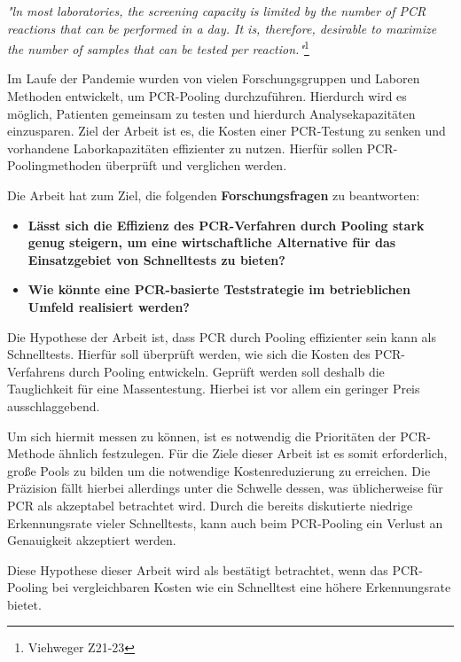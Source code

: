 \textit{"ln most laboratories, the screening capacity is limited by the number of PCR reactions that can be performed in a day. It is, therefore, desirable to maximize the number of samples that can be tested per reaction."}\footnote{Viehweger Z21-23}

Im Laufe der Pandemie wurden von vielen Forschungsgruppen und Laboren Methoden entwickelt, um PCR-Pooling durchzuführen.
Hierdurch wird es möglich, Patienten gemeinsam zu testen und hierdurch Analysekapazitäten einzusparen.
Ziel der Arbeit ist es, die Kosten einer PCR-Testung zu senken und vorhandene Laborkapazitäten effizienter zu nutzen.
Hierfür sollen PCR-Poolingmethoden überprüft und verglichen werden.

Die Arbeit hat zum Ziel, die folgenden \textbf{Forschungsfragen} zu beantworten:

\begin{itemize}
	\item \textbf{Lässt sich die Effizienz des PCR-Verfahren durch Pooling stark genug steigern, um eine wirtschaftliche Alternative für das Einsatzgebiet von Schnelltests zu bieten?}
	\item \textbf{Wie könnte eine PCR-basierte Teststrategie im betrieblichen Umfeld realisiert werden?}
\end{itemize}

Die Hypothese der Arbeit ist, dass PCR durch Pooling effizienter sein kann als Schnelltests.
Hierfür soll überprüft werden, wie sich die Kosten des PCR-Verfahrens durch Pooling entwickeln.
Geprüft werden soll deshalb die Tauglichkeit für eine Massentestung.
Hierbei ist vor allem ein geringer Preis ausschlaggebend.

Um sich hiermit messen zu können, ist es notwendig die Prioritäten der PCR-Methode ähnlich festzulegen.
Für die Ziele dieser Arbeit ist es somit erforderlich, große Pools zu bilden um die notwendige Kostenreduzierung zu erreichen.
Die Präzision fällt hierbei allerdings unter die Schwelle dessen, was üblicherweise für PCR als akzeptabel betrachtet wird.
Durch die bereits diskutierte niedrige Erkennungsrate vieler Schnelltests, kann auch beim PCR-Pooling ein Verlust an Genauigkeit akzeptiert werden.

Diese Hypothese dieser Arbeit wird als bestätigt betrachtet, wenn das PCR-Pooling bei vergleichbaren Kosten wie ein Schnelltest eine höhere Erkennungsrate bietet.


